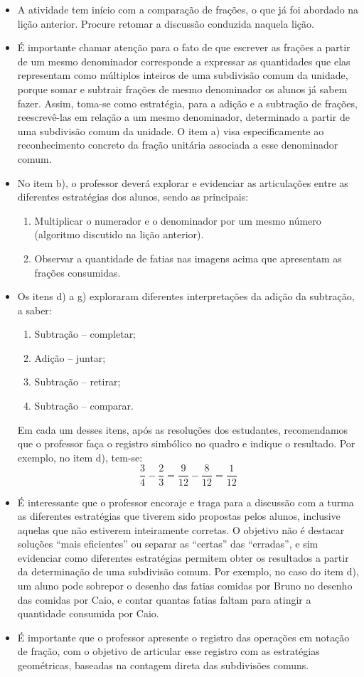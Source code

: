 \documentclass[10 pt,usenames,dvipsnames, oneside]{article}
\begin{document}
\begin{goals}
\begin{itemize}
   \item  A atividade tem início com a comparação de frações, o que já foi abordado na lição anterior. Procure retomar a discussão conduzida naquela lição.
   \item  É importante chamar atenção para o fato de que escrever as frações a partir de um mesmo denominador corresponde a expressar as quantidades que elas representam como múltiplos inteiros de uma subdivisão comum da unidade, porque somar e subtrair frações de mesmo denominador os alunos já sabem fazer. Assim, toma-se como estratégia, para a adição e a subtração de frações, reescrevê-las em relação a um mesmo denominador, determinado a partir de uma subdivisão comum da unidade. O item a) visa especificamente ao reconhecimento concreto da fração unitária associada a esse denominador comum.
   \item  No item b), o professor deverá explorar e evidenciar as articulações entre as diferentes estratégias dos alunos, sendo as principais:
   \begin{enumerate}
   \item  Multiplicar o numerador e o denominador por um mesmo número (algoritmo discutido na lição anterior).
   \item  Observar a quantidade de fatias nas imagens acima que apresentam as frações consumidas.
   \end{enumerate}
   \item  Os itens d) a g) exploraram diferentes interpretações da adição da subtração, a saber:
   \begin{enumerate}
\item Subtração – completar;
\item Adição – juntar;
\item Subtração – retirar;
\item Subtração – comparar.
   \end{enumerate}

   Em cada um desses itens, após as resoluções dos estudantes, recomendamos que o professor faça o registro simbólico no quadro e indique o resultado. Por exemplo, no item d), tem-se:
$$\frac{3}{4} - \frac{2}{3} = \frac{9}{12} - \frac{8}{12}=\frac{1}{12}$$

  \item   É interessante que o professor encoraje e traga para a discussão com a turma as diferentes estratégias que tiverem sido propostas pelos alunos, inclusive aquelas que não estiverem inteiramente corretas. O objetivo não é destacar soluções ``mais eficientes'' ou separar as ``certas'' das ``erradas'', e sim evidenciar como diferentes estratégias permitem obter os resultados a partir da determinação de uma subdivisão comum. Por exemplo, no caso do item d), um aluno pode sobrepor o desenho das fatias comidas por Bruno no desenho das comidas por Caio, e contar quantas fatias faltam para atingir a quantidade consumida por Caio.
  \item  É importante que o professor apresente o registro das operações em notação de fração, com o objetivo de articular esse registro com as estratégias geométricas, baseadas na contagem direta das subdivisões comuns.


\end{itemize}
\end{goals}
\end{document}
